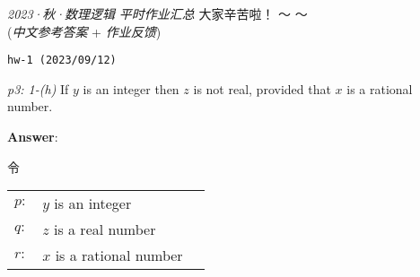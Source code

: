 \documentclass[UTF8,12pt,a4paper]{ctexart}
\begin{document}

\begin{center}
	\textit{2023·秋·数理逻辑} \qquad \textit{平时作业汇总}  \qquad 大家辛苦啦！  \faCoffee ～ ～\\
	(\textit{中文参考答案} + \textit{作业反馈})
\end{center}


\noindent\texttt{hw-1 (2023/09/12) }

\emph{p3: 1-(h)} \quad
If $y$ is an integer then $z$ is not real, provided that $x$ is a rational number.


\noindent\textbf{Answer}:

令
\begin{center}
	\begin{tabular}{l l l }
 $p:$ & $y$ is an integer  \\
 $q:$ & $z$ is a real number  \\
 $r:$ & $x$ is a rational number 
\end{tabular}
\end{center}
\end{document}
